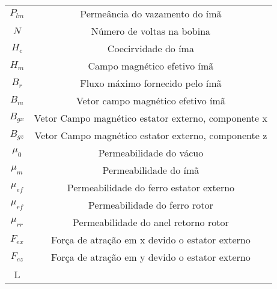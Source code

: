\begin{tabular}{|c|c|}
	$P_{lm}$		& Permeância do vazamento do ímã	\\

	$N$				& Número de voltas na bobina \\
	
	$H_c$			& Coecirvidade do íma \\
	$H_m$			& Campo magnético efetivo ímã \\

	$B_r$ 			& Fluxo máximo fornecido pelo ímã \\
	$B_m$			& Vetor campo magnético efetivo ímã \\
	$B_{gx}$		& Vetor Campo magnético estator externo, componente x \\
	$B_{gz}$		& Vetor Campo magnético estator externo, componente z \\

	$\mu_0$			& Permeabilidade do vácuo \\
	$\mu_m$			& Permeabilidade do ímã \\
	$\mu_{ef}$		& Permeabilidade do ferro estator externo \\
	$\mu_{rf}$		& Permeabilidade do ferro rotor \\
	$\mu_{rr}$		& Permeabilidade do anel retorno rotor\\

	$F_{ex}$		& Força de atração em x devido o estator externo \\
	$F_{ez}$		& Força de atração em y devido o estator externo \\
L

\end{tabular} 
